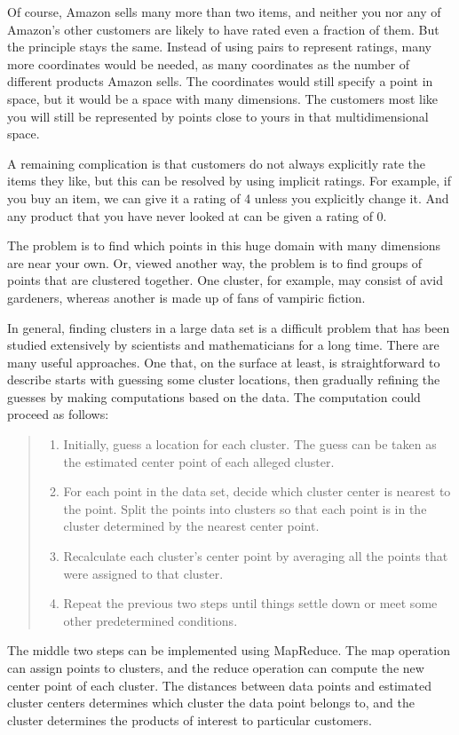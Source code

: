Of course, Amazon sells many more than two items, and neither you nor any
of Amazon's other customers are likely to have rated even a fraction of them.
But the principle stays the same.  Instead of using pairs to represent
ratings, many more coordinates would be needed, as many coordinates
as the number of different products Amazon sells.
The coordinates would still specify a point in space,
but it would be a space with many dimensions.
The customers most like you will still be represented by points close to yours
in that multidimensional space.

A remaining complication is that customers do not always explicitly rate the
items they like, but this can be resolved by using implicit ratings.
For example, if you buy an item, we can give it a rating of 4 unless you
explicitly change it.  And any product that you have never looked at
can be given a rating of 0.

The problem is to find which points in this huge domain with many dimensions
are near your own. Or, viewed another way, the problem is to find groups of
points that are clustered together. One cluster, for example, may consist of
avid gardeners, whereas another is made up of fans of vampiric fiction.

In general, finding clusters
in a large data set is a difficult problem
that has been studied extensively
by scientists and mathematicians for a long time.
There are many useful approaches.  One that, on the surface at least,
is straightforward to describe starts with guessing some cluster locations,
then gradually refining the guesses by making computations based on the data.
The computation could proceed as follows:
\begin{quote}
\label{cluster-process}
\begin{enumerate}
    \item Initially, guess a location for each cluster. The guess can be
        taken as the estimated center point of each alleged cluster.
    \item For each point in the data set, decide which cluster center is nearest
        to the point.  Split the points into clusters so that each point is
        in the cluster determined by the nearest center point.
    \item Recalculate each cluster's center point by averaging all the
        points that were assigned to that cluster.
    \item Repeat the previous two steps until things settle down or meet
        some other predetermined conditions.
\end{enumerate}
\end{quote}
The middle two steps can be implemented using MapReduce.  The map operation can
assign points to clusters, and the reduce operation can compute the new center
point of each cluster.  The distances between data points
and estimated cluster centers determines which cluster the data point belongs to,
and the cluster determines the products of interest to particular customers.

